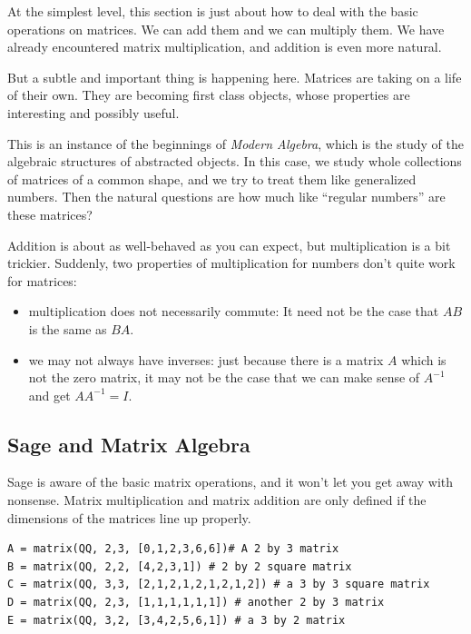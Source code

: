 \documentclass[10pt,]{book}
\theoremstyle{plain}
\theoremstyle{definition}
\numberwithin{equation}{section}
\begin{document}
      At the simplest level, this section is just about how to deal with the
      basic operations on matrices. We can add them and we can multiply them.
      We have already encountered matrix multiplication, and addition is even
      more natural.
\par

      But a subtle and important thing is happening here. Matrices are taking
      on a life of their own. They are becoming first class objects, whose
      properties are interesting and possibly useful.
\par

      This is an instance of the beginnings of \emph{Modern Algebra}, which
      is the study of the algebraic structures of abstracted objects. In this
      case, we study whole collections of matrices of a common shape, and we
      try to treat them like generalized numbers. Then the natural questions
      are how much like ``regular numbers'' are these matrices?
\par

      Addition is about as well-behaved as you can expect, but multiplication
      is a bit trickier. Suddenly, two properties of multiplication for numbers
      don't quite work for matrices:
\begin{itemize}
\item{}multiplication does not necessarily commute: It need not be the case
        that \(AB\) is the same as \(BA\).
      \item{}we may not always have inverses: just because there is a
        matrix \(A\) which is not the zero matrix, it may not be the case
        that we can make sense of \(A^{-1}\) and get \(AA^{-1} = I\).
      \end{itemize}
\typeout{************************************************}
\typeout{************************************************}
\subsection[Sage and Matrix Algebra]{Sage and Matrix Algebra}\label{subsection-39}

      Sage is aware of the basic matrix operations, and it won't let you get
      away with nonsense. Matrix multiplication and matrix addition are only
      defined if the dimensions of the matrices line up properly.
\begin{lstlisting}[style=sageinput]
A = matrix(QQ, 2,3, [0,1,2,3,6,6])# A 2 by 3 matrix
B = matrix(QQ, 2,2, [4,2,3,1]) # 2 by 2 square matrix
C = matrix(QQ, 3,3, [2,1,2,1,2,1,2,1,2]) # a 3 by 3 square matrix
D = matrix(QQ, 2,3, [1,1,1,1,1,1]) # another 2 by 3 matrix
E = matrix(QQ, 3,2, [3,4,2,5,6,1]) # a 3 by 2 matrix
\end{lstlisting}
\par
\end{document}
